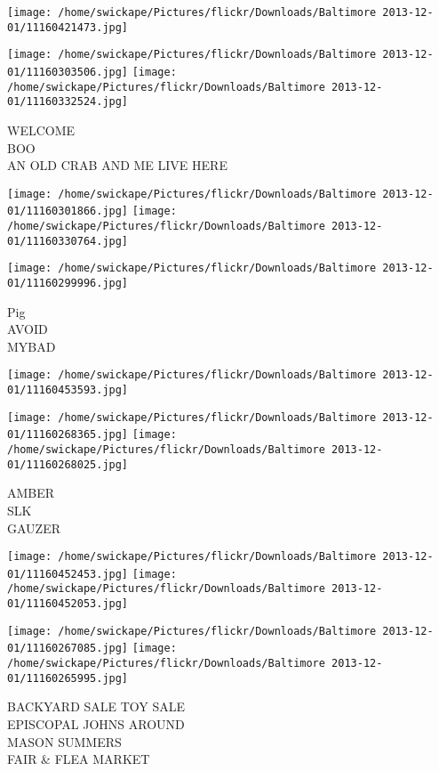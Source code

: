 \documentclass[10pt,letterpaper]{article}
\begin{document}
\texttt{[image: /home/swickape/Pictures/flickr/Downloads/Baltimore 2013-12-01/11160421473.jpg]}

\vspace{0.25in}
\texttt{[image: /home/swickape/Pictures/flickr/Downloads/Baltimore 2013-12-01/11160303506.jpg]}
\texttt{[image: /home/swickape/Pictures/flickr/Downloads/Baltimore 2013-12-01/11160332524.jpg]}

WELCOME\\
BOO\\
AN OLD CRAB AND ME LIVE HERE
\pagebreak

\texttt{[image: /home/swickape/Pictures/flickr/Downloads/Baltimore 2013-12-01/11160301866.jpg]}
\texttt{[image: /home/swickape/Pictures/flickr/Downloads/Baltimore 2013-12-01/11160330764.jpg]}

\texttt{[image: /home/swickape/Pictures/flickr/Downloads/Baltimore 2013-12-01/11160299996.jpg]}

Pig\\
AVOID\\
MYBAD
\pagebreak

\texttt{[image: /home/swickape/Pictures/flickr/Downloads/Baltimore 2013-12-01/11160453593.jpg]}

\vspace{0.25in}
\texttt{[image: /home/swickape/Pictures/flickr/Downloads/Baltimore 2013-12-01/11160268365.jpg]}
\texttt{[image: /home/swickape/Pictures/flickr/Downloads/Baltimore 2013-12-01/11160268025.jpg]}

AMBER\\
SLK\\
GAUZER
\pagebreak

\texttt{[image: /home/swickape/Pictures/flickr/Downloads/Baltimore 2013-12-01/11160452453.jpg]}
\texttt{[image: /home/swickape/Pictures/flickr/Downloads/Baltimore 2013-12-01/11160452053.jpg]}

\texttt{[image: /home/swickape/Pictures/flickr/Downloads/Baltimore 2013-12-01/11160267085.jpg]}
\texttt{[image: /home/swickape/Pictures/flickr/Downloads/Baltimore 2013-12-01/11160265995.jpg]}

BACKYARD SALE TOY SALE\\
EPISCOPAL JOHNS AROUND\\
MASON SUMMERS\\
FAIR \& FLEA MARKET
\pagebreak
\end{document}
